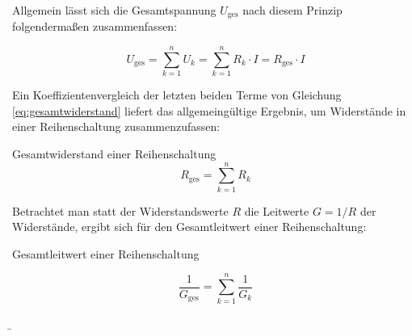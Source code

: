 \begin{frame}
{		Allgemein lässt sich die Gesamtspannung $U_\mathrm{ges}$ nach diesem Prinzip folgendermaßen zusammenfassen:
		
		\begin{equation}
			U_\mathrm{ges} = \sum_{k=1}^{n} U_k = \sum_{k=1}^{n} R_k \cdot I = R_\mathrm{ges} \cdot I
			\label{eq:gesamtwiderstand}
		\end{equation}
		
		Ein Koeffizientenvergleich der letzten beiden Terme von Gleichung \ref{eq:gesamtwiderstand} liefert das allgemeingültige 
		Ergebnis, um Widerstände in einer Reihenschaltung zusammenzufassen:
		
		\begin{Merksatz}{Gesamtwiderstand einer Reihenschaltung}{}
			\begin{equation}
				R_\mathrm{ges} = \sum_{k=1}^{n} R_k
			\end{equation}
		\end{Merksatz}
		
		Betrachtet man statt der Widerstandswerte $R$ die Leitwerte $G = 1/R$ der Widerstände, ergibt sich für den Gesamtleitwert
		einer Reihenschaltung: 
		
		
		\begin{Merksatz}{Gesamtleitwert einer Reihenschaltung}{}
			
			
			\begin{equation}
				\frac{1}{G_\mathrm{ges}} = \sum_{k=1}^{n} \frac{1}{G_k}
			\end{equation}
			
			
			
			
		\end{Merksatz}
		
		
		
		
		
		
		
		
		
		
		
		
	}
	
	\b{
	
		\begin{columns}



\end{columns}}
\end{frame}
